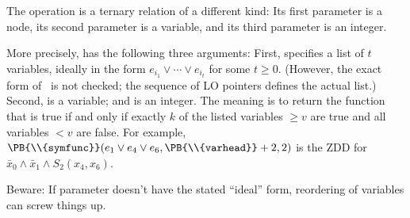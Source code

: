 The  operation is a ternary relation of a
different kind:
Its first parameter is a node, its second parameter is a variable, and
its third parameter is an integer.

More precisely,  has the following three arguments:
First,  specifies
a list of $t$ variables, ideally in the form $e_{i_1}\lor\cdots\lor e_{i_t}$
for some $t\ge0$. (However, the exact form of~ is not checked; the
sequence of {\mc LO} pointers defines the actual list.)
Second,  is a variable; and  is an integer. The meaning is to
return the function that is true if and only if exactly $k$ of the
listed variables $\ge v$ are true and all variables $<v$ are false.
For example, $\PB{\\{symfunc}}(e_1\lor e_4\lor e_6,\PB{\\{varhead}}+2,2)$ is
the ZDD for $\bar x_0\land\bar x_1\land S_2(x_4,x_6)$.

Beware: If parameter  doesn't have the stated ``ideal'' form,
reordering of variables can screw things up.

